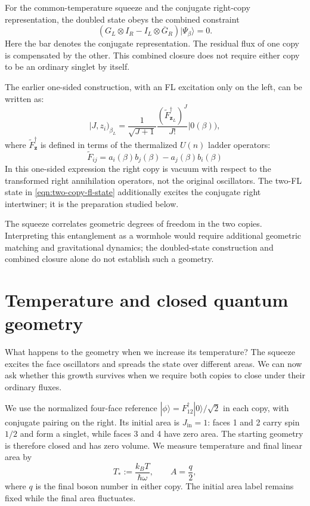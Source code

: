 \documentclass[twocolumn,draft,aps,nofootinbib,nobibnotes,final]{revtex4-2}
\newcommand{\bz}{\mathbf{z}}
\newcommand{\bket}[1]{\vert #1 )}
\begin{document}
For the common-temperature squeeze and the conjugate right-copy representation, the doubled state obeys the combined constraint
\begin{equation}\label{eqn:combined-closure}
 (G_L\otimes I_R-I_L\otimes\overline{G}_R)|\Psi_\beta\rangle=0.
\end{equation}
Here the bar denotes the conjugate representation. The residual flux of one copy is compensated by the other. This combined closure does not require either copy to be an ordinary singlet by itself.

The earlier one-sided construction, with an FL excitation only on the left, can be written as:
\begin{equation}\label{eqn:u-n-thermal-coherent-state}
	\bket{J, z_i}_{\beta _{L}} = \frac{1}{\sqrt{J+1}}\frac{(\tilde F^\dag_{\bz _{L}})^J}{J!}\bket{0(\beta)},
\end{equation}
where $ \tilde F^\dag_\bz $ is defined in terms of the thermalized $ U(n) $ ladder operators:
\begin{equation}\label{eqn:u-n-thermal-ops}
	\tilde F_{ij} = a_i(\beta) b_j (\beta) - a_j(\beta) b_i(\beta)
\end{equation}
In this one-sided expression the right copy is vacuum with respect to the transformed right annihilation operators, not the original oscillators. The two-FL state in \eqref{eqn:two-copy-fl-state} additionally excites the conjugate right intertwiner; it is the preparation studied below.

The squeeze correlates geometric degrees of freedom in the two copies. Interpreting this entanglement as a wormhole would require additional geometric matching and gravitational dynamics; the doubled-state construction and combined closure alone do not establish such a geometry.

\section{Temperature and closed quantum geometry}\label{sec:temperature-geometry}

What happens to the geometry when we increase its temperature? The squeeze excites the face oscillators and spreads the state over different areas. We can now ask whether this growth survives when we require both copies to close under their ordinary fluxes.

We use the normalized four-face reference $|\phi\rangle=F_{12}^{\dagger}|0\rangle/\sqrt{2}$ in each copy, with conjugate pairing on the right. Its initial area is $J_{\mathrm{in}}=1$: faces 1 and 2 carry spin $1/2$ and form a singlet, while faces 3 and 4 have zero area. The starting geometry is therefore closed and has zero volume. We measure temperature and final linear area by
\begin{equation}
 T_*:=\frac{k_BT}{\hbar\omega},\qquad A=\frac{q}{2},
\end{equation}
where $q$ is the final boson number in either copy. The initial area label remains fixed while the final area fluctuates.
\end{document}

